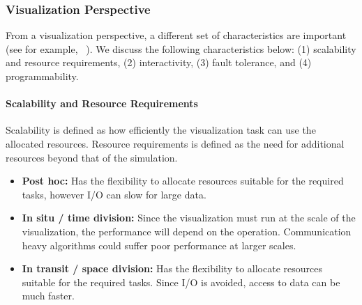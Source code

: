
\subsubsection{Visualization Perspective}
From a visualization perspective, a different set of characteristics are important (see for example, ~\cite{Kress-isav15}).
We discuss the following characteristics below: (1) scalability and resource requirements, (2) interactivity, (3) fault tolerance, and (4) programmability.

\paragraph{\textbf{Scalability and Resource Requirements}}
Scalability is defined as how efficiently the visualization task can use the allocated resources.
Resource requirements is defined as the need for additional resources beyond that of the simulation.
\begin{itemize}
    \item \textbf{Post hoc:} Has the flexibility to allocate resources suitable for the required tasks, however I/O can slow for large data.
    \item \textbf{In situ / time division:} Since the visualization must run at the scale of the visualization, the performance will depend on the operation. Communication heavy algorithms could suffer poor performance at larger scales.
    \item \textbf{In transit / space division:} Has the flexibility to allocate resources suitable for the required tasks. Since I/O is avoided, access to data can be much faster.
\end{itemize}

